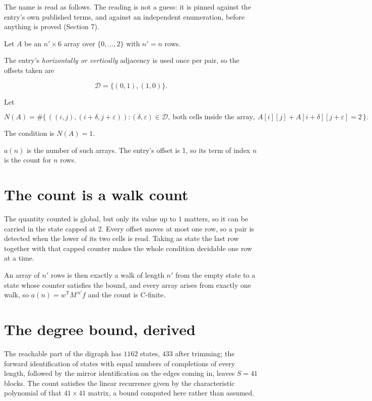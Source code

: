 \documentclass[11pt]{article}
\theoremstyle{definition}
\begin{document}
The name is read as follows. The reading is not a guess: it is pinned against the entry's own published terms, and against an independent enumeration, before anything is proved (Section 7).

Let $A$ be an $n' \times 6$ array over $\{0,\dots,2\}$ with $n' = n$ rows.

The entry's {\itshape horizontally or vertically} adjacency is used once per pair, so the offsets taken are

\[\mathcal{D} = \{(0,1), (1,0)\}.\]

Let

\[N(A) = \#\bigl\{\,((i,j),(i{+}\delta,j{+}\varepsilon)) : (\delta,\varepsilon) \in \mathcal{D},\ \text{both cells inside the array},\ A[i][j] + A[i{+}\delta][j{+}\varepsilon] = 2\,\bigr\}.\]

The condition is $N(A) = 1$.

$a(n)$ is the number of such arrays. The entry's offset is 1, so its term of index $n$ is the count for $n$ rows.

\section{The count is a walk count}

The quantity counted is global, but only its value up to $1$ matters, so it can be carried in the state capped at $2$. Every offset moves at most one row, so a pair is detected when the lower of its two cells is read. Taking as state the last row together with that capped counter makes the whole condition decidable one row at a time.

An array of $n'$ rows is then exactly a walk of length $n'$ from the empty state to a state whose counter satisfies the bound, and every array arises from exactly one walk, so $a(n) = w^{\mathsf T}M^{\,n'}f$ and the count is C-finite.

\section{The degree bound, derived}

The reachable part of the digraph has $1162$ states, $433$ after trimming; the forward identification of states with equal numbers of completions of every length, followed by the mirror identification on the edges coming in, leaves $S = 41$ blocks. The count satisfies the linear recurrence given by the characteristic polynomial of that $41\times41$ matrix, a bound computed here rather than assumed.
\end{document}
